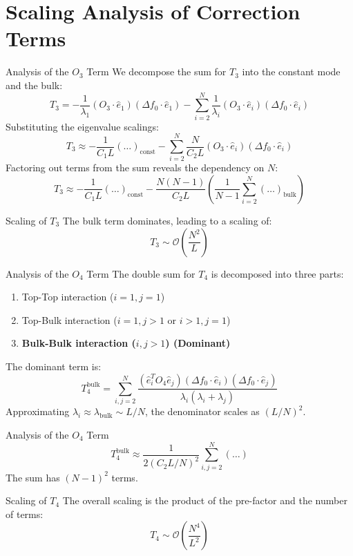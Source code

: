 \documentclass{beamer}
\newcommand{\Order}{\mathcal{O}}
\begin{document}
\section{Scaling Analysis of Correction Terms}

\begin{frame}{Analysis of the $O_3$ Term}
We decompose the sum for $T_3$ into the constant mode and the bulk:
\[
T_3 = -\frac{1}{\lambda_{1}}(O_{3}\cdot\hat{e}_{1})(\Delta f_{0}\cdot\hat{e}_{1}) - \sum_{i=2}^N\frac{1}{\lambda_{i}}(O_{3}\cdot\hat{e}_{i})(\Delta f_{0}\cdot\hat{e}_{i})
\]
\vspace{0.5cm}
Substituting the eigenvalue scalings:
\[
T_3 \approx -\frac{1}{C_1 L}(\dots)_{\text{const}} - \sum_{i=2}^N\frac{N}{C_2 L}(O_{3}\cdot\hat{e}_{i})(\Delta f_{0}\cdot\hat{e}_{i})
\]
\vspace{0.5cm}
Factoring out terms from the sum reveals the dependency on $N$:
\[
T_3 \approx -\frac{1}{C_1 L}(\dots)_{\text{const}} - \frac{N(N-1)}{C_2 L} \left( \frac{1}{N-1} \sum_{i=2}^N (\dots)_{\text{bulk}} \right)
\]
\begin{alertblock}{Scaling of $T_3$}
The bulk term dominates, leading to a scaling of:
\[ T_3 \sim \Order\left(\frac{N^2}{L}\right) \]
\end{alertblock}
\end{frame}

\begin{frame}{Analysis of the $O_4$ Term}
The double sum for $T_4$ is decomposed into three parts:
\begin{enumerate}
    \item Top-Top interaction ($i=1, j=1$)
    \item Top-Bulk interaction ($i=1, j>1$ or $i>1, j=1$)
    \item \textbf{Bulk-Bulk interaction ($i,j > 1$) (Dominant)}
\end{enumerate}
\vspace{0.5cm}
The dominant term is:
\[
T_4^{\text{bulk}} = \sum_{i,j=2}^N \frac{(\hat{e}_{i}^{T}O_{4}\hat{e}_{j})(\Delta f_{0}\cdot \hat{e}_{i})(\Delta f_{0}\cdot \hat{e}_{j})}{\lambda_i(\lambda_i+\lambda_j)}
\]
\vspace{0.5cm}
Approximating $\lambda_i \approx \lambda_{\text{bulk}} \sim L/N$, the denominator scales as $(L/N)^2$.
\end{frame}

\begin{frame}{Analysis of the $O_4$ Term}
\[
T_4^{\text{bulk}} \approx \frac{1}{2(C_2 L/N)^2} \sum_{i,j=2}^N \left( \dots \right)
\]
The sum has $(N-1)^2$ terms.
\begin{alertblock}{Scaling of $T_4$}
The overall scaling is the product of the pre-factor and the number of terms:
\[ T_4 \sim \Order\left(\frac{N^4}{L^2}\right) \]
\end{alertblock}
\end{frame}
\end{document}
